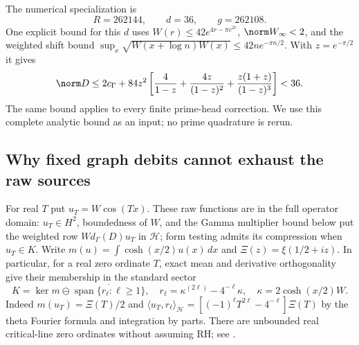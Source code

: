 \documentclass[11pt,a4paper]{article}
\numberwithin{equation}{section}
\theoremstyle{definition}\newtheorem{definition}[theorem]{Definition}
\theoremstyle{remark}\newtheorem{remark}[theorem]{Remark}
\newcommand{\Hh}{\mathcal H}\newcommand{\Hw}{\mathcal H}
\begin{document}
The numerical specialization is
\begin{equation}\label{ur:eq:constants}
 R=262144,\qquad d=36,\qquad g=262108.
\end{equation}
One explicit bound for this $d$ uses $W(r)\le42e^{4r-\pi e^{2r}}$,
$\norm W_\infty<2$, and the weighted shift bound
$\sup_x\sqrt{W(x+\log n)W(x)}\le42ne^{-\pi n/2}$.
With $z=e^{-\pi/2}$ it gives
\[
 \norm D\le2c_\Gamma+
 84z^2\left[\frac4{1-z}+\frac{4z}{(1-z)^2}
                     +\frac{z(1+z)}{(1-z)^3}\right]<36.
\]
The same bound applies to every finite prime-head correction. We use
this complete analytic bound as an input; no prime quadrature is rerun.

\subsection{Why fixed graph debits cannot exhaust the raw sources}
For real $T$ put $u_T=W\cos(Tx)$. These raw functions are in the full
operator domain: $u_T\in H^2$, boundedness of $W$, and the Gamma
multiplier bound below put the weighted row $W d_\Gamma(D)u_T$ in
$\Hh$; form testing admits its compression when $u_T\in K$.
Write $m(u)=\int\cosh(x/2)u(x)\,dx$ and
$\Xi(z)=\xi(1/2+iz)$. In particular, for a real
zero ordinate $T$, exact mean and derivative orthogonality give their
membership in the standard sector
\[
 K=\ker m\ominus\overline{\operatorname{span}\{r_\ell:\ell\ge1\}},
 \quad r_\ell=\kappa^{(2\ell)}-4^{-\ell}\kappa,
 \quad\kappa=2\cosh(x/2)W.
\]
Indeed $m(u_T)=\Xi(T)/2$ and
$\langle u_T,r_\ell\rangle_\Hh=
[(-1)^\ell T^{2\ell}-4^{-\ell}]\Xi(T)$ by the theta Fourier
formula \cite[(1.2)]{fzLagarias} and integration by parts.
There are unbounded real critical-line zero ordinates without assuming
RH; see \cite[Section 25.10(i)]{DLMF}.
\end{document}
